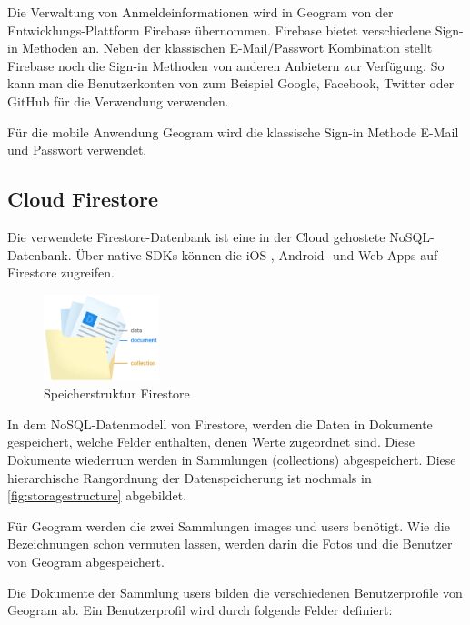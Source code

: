 Die Verwaltung von Anmeldeinformationen wird in Geogram von der Entwicklungs-Plattform Firebase übernommen. Firebase bietet verschiedene Sign-in Methoden an. Neben der klassischen E-Mail/Passwort Kombination stellt Firebase noch die Sign-in Methoden von anderen Anbietern zur Verfügung. So kann man die Benutzerkonten von zum Beispiel Google, Facebook, Twitter oder GitHub für die Verwendung verwenden.

Für die mobile Anwendung Geogram wird die klassische Sign-in Methode \glqq E-Mail und Passwort\grqq{} verwendet.

\subsection{Cloud Firestore\label{sup3.2.2:Unterpunkt-2}}

Die verwendete Firestore-Datenbank ist eine in der Cloud gehostete NoSQL-Datenbank. Über native SDKs können die iOS-, Android- und Web-Apps auf Firestore zugreifen.

\begin{figure}
    \begin{center}
        \includegraphics[width=0.3\textwidth]{images/firestore.png}
    \end{center}
    \caption{Speicherstruktur Firestore}
    \label{fig:storagestructure}
\end{figure}

In dem NoSQL-Datenmodell von Firestore, werden die Daten in Dokumente gespeichert, welche Felder enthalten, denen Werte zugeordnet sind. Diese Dokumente wiederrum werden in Sammlungen (collections) abgespeichert. Diese hierarchische Rangordnung der Datenspeicherung ist nochmals in \autoref{fig:storagestructure} abgebildet.

Für Geogram werden die zwei Sammlungen \glqq images\grqq{} und \glqq users\grqq{} benötigt. Wie die Bezeichnungen schon vermuten lassen, werden darin die Fotos und die Benutzer von Geogram abgespeichert.

Die Dokumente der Sammlung \glqq users\grqq{} bilden die verschiedenen Benutzerprofile von Geogram ab. Ein Benutzerprofil wird durch folgende Felder definiert:


